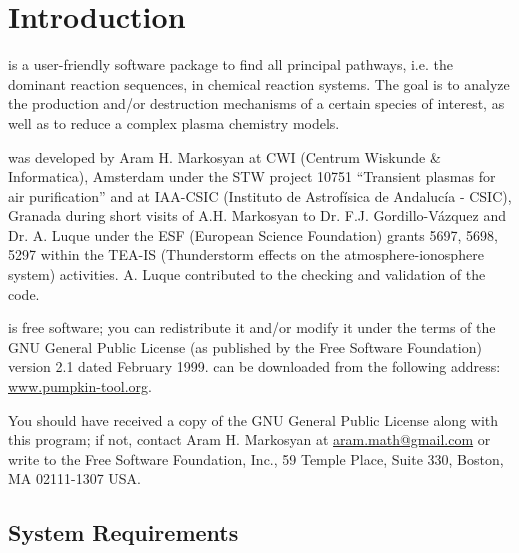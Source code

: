 
\chapter{Introduction}
\label{chap_1}
\pump{} is a user-friendly software package to find all principal pathways, i.e. the dominant reaction sequences, in chemical reaction systems. The goal is to analyze the production and/or destruction mechanisms of a certain species of interest, as well as to reduce a complex plasma chemistry models.

\pump{} was developed by Aram H. Markosyan at CWI (Centrum Wis\-kunde \& Informatica), Amsterdam under the STW project 10751 ``Transient plasmas for air purification'' and at IAA-CSIC (Instituto de Astrofísica de Andalucía - CSIC), Granada during short visits of A.H. Markosyan to Dr. F.J. Gordillo-V\'{a}zquez and Dr. A. Luque under the ESF (European Science Foundation) grants 5697, 5698, 5297 within the TEA-IS (Thunderstorm effects on the atmosphere-ionosphere system) activities. A. Luque contributed to the checking and validation of the code.

\pump{} is free software; you can redistribute it and/or modify it under the terms of the GNU General Public License (as published by the Free Software Foundation) version 2.1 dated February 1999. \pump{} can be downloaded from the following address: \url{www.pumpkin-tool.org}.

You should have received a copy of the GNU General Public License along with this program; if not, contact Aram H. Markosyan at \url{aram.math@gmail.com} or write to the Free Software Foundation, Inc., 59 Temple Place, Suite 330, Boston, MA 02111-1307 USA.


\section{System Requirements}
\label{sec_1_1}

